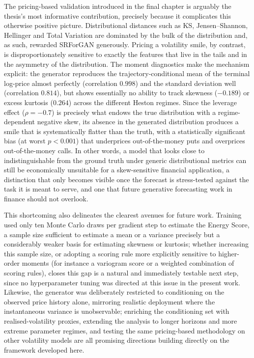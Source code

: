 The pricing-based validation introduced in the final chapter is arguably
the thesis's most informative contribution, precisely because it complicates
this otherwise positive picture. Distributional distances such as KS,
Jensen--Shannon, Hellinger and Total Variation are dominated by the bulk of
the distribution and, as such, rewarded SRForGAN generously. Pricing a
volatility smile, by contrast, is disproportionately sensitive to exactly
the features that live in the tails and in the asymmetry of the
distribution. The moment diagnostics make the mechanism explicit: the
generator reproduces the trajectory-conditional mean of the terminal
log-price almost perfectly (correlation $0.998$) and the standard deviation
well (correlation $0.814$), but shows essentially no ability to track
skewness ($-0.189$) or excess kurtosis ($0.264$) across the different Heston
regimes. Since the leverage effect ($\rho=-0.7$) is precisely what endows
the true distribution with a regime-dependent negative skew, its absence in
the generated distribution produces a smile that is systematically flatter
than the truth, with a statistically significant bias (at worst $p<0.001$)
that underprices out-of-the-money puts and overprices out-of-the-money
calls. In other words, a model that looks close to indistinguishable from
the ground truth under generic distributional metrics can still be
economically unsuitable for a skew-sensitive financial application, a
distinction that only becomes visible once the forecast is stress-tested
against the task it is meant to serve, and one that future generative
forecasting work in finance should not overlook.

This shortcoming also delineates the clearest avenues for future work.
Training used only ten Monte Carlo draws per gradient step to estimate the
Energy Score, a sample size sufficient to estimate a mean or a variance
precisely but a considerably weaker basis for estimating skewness or
kurtosis; whether increasing this sample size, or adopting a scoring rule
more explicitly sensitive to higher-order moments (for instance a variogram
score or a weighted combination of scoring rules), closes this gap is a
natural and immediately testable next step, since no hyperparameter tuning
was directed at this issue in the present work. Likewise, the generator was
deliberately restricted to conditioning on the observed price history
alone, mirroring realistic deployment where the instantaneous variance is
unobservable; enriching the conditioning set with realised-volatility
proxies, extending the analysis to longer horizons and more extreme
parameter regimes, and testing the same pricing-based methodology on other
volatility models are all promising directions building directly on the
framework developed here.